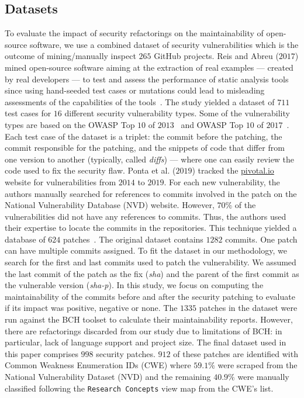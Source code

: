 \documentclass[10pt,conference]{IEEEtran}
\begin{document}
\subsection{Datasets}
%
To evaluate the impact of security refactorings on the maintainability of
open-source software, we use a combined dataset of security vulnerabilities which is 
the outcome of mining/manually inspect $265$ GitHub projects. Reis and Abreu 
($2017$) mined open-source
software aiming at the extraction of real examples --- created by real
developers --- to test and assess the performance of static analysis tools~\cite{Reis:2017:IJSSE} since
using hand-seeded test cases or mutations could lead to misleading assessments
of the capabilities of the tools~\cite{just2014mutants}. The study yielded a
dataset of $711$ test cases for $16$ different security vulnerability types. Some of the vulnerability types
are based on the OWASP Top $10$ of $2013$~\cite{oswap:2013} and OWASP Top $10$ of
$2017$~\cite{oswap:2017}. Each test case of the
dataset is a triplet: the commit before the patching, the commit responsible
for the patching, and the snippets of code that differ from one version to
another (typically, called \textit{diffs}) --- where one can easily review the
code used to fix the security flaw. 
%
Ponta et al. ($2019$) tracked the \url{pivotal.io} website for vulnerabilities 
from $2014$ to $2019$. For each new vulnerability, the authors manually searched 
for references to commits involved in the patch on the National Vulnerability Database (NVD) website. However, $70\%$
of the vulnerabilities did not have any references to commits. Thus, the authors
used their expertise to locate the commits in the repositories. This technique 
yielded a database of $624$ patches~\cite{10.1109/MSR.2019.00064}. The original 
dataset contains $1282$ commits. One patch can have multiple commits assigned.
To fit the dataset in our methodology, we search for the first and last commits
used to patch the vulnerability. We assumed the last commit of the patch as 
the fix (\emph{sha}) and the parent of the first commit as the vulnerable version 
(\emph{sha-p}).
%
In this study, we focus on computing the
maintainability of the commits before and after the security patching to
evaluate if its impact was positive, negative or none.
The $1335$ patches in the dataset were run against the BCH toolset to
calculate their maintainability reports. However, there are refactorings
discarded from our study due to limitations of BCH: in particular, lack of
language support and project size. The final dataset used in this paper comprises
$998$ security patches. $912$ of these patches are identified with Common Weakness
Enumeration IDs (CWE) where $59.1\%$ were scraped from the National Vulnerability Dataset (NVD) and the remaining $40.9\%$ were manually classified following the \texttt{Research Concepts} view map from the CWE's list.
\end{document}
